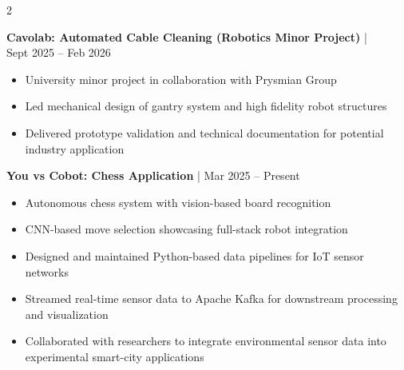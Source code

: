 \documentclass[9pt, a4paper, withhyper, normalphoto]{altacv}
\begin{document}
\begin{paracol}{2}
    \divider
    
    \textbf{Cavolab: Automated Cable Cleaning (Robotics Minor Project)} \href{https://cad.onshape.com/documents/b36124d5af2122816059b47e/w/a098d324fe5fae0158086b4f/e/7f46e26306718293dd50d8e4}{\faCube} | \\
    Sept 2025 -- Feb 2026
    \begin{itemize}
      \item University minor project in collaboration with Prysmian Group
      \item Led mechanical design of gantry system and high fidelity robot structures
      \item Delivered prototype validation and technical documentation for potential industry application
    \end{itemize}

    \divider
    
    \textbf{You vs Cobot: Chess Application} 
    \href{https://github.com/C-O-R-A/cora-chess}{\faGithub} | Mar 2025 -- Present
    \begin{itemize}
      \item Autonomous chess system with vision-based board recognition
      \item CNN-based move selection showcasing full-stack robot integration
    \end{itemize}

    \divider

    


    
    
    \begin{itemize}
        \item Designed and maintained Python-based data pipelines for IoT sensor networks
        \item Streamed real-time sensor data to Apache Kafka for downstream processing and visualization
        \item Collaborated with researchers to integrate environmental sensor data into experimental smart-city applications
    \end{itemize}


\end{paracol}
\end{document}
